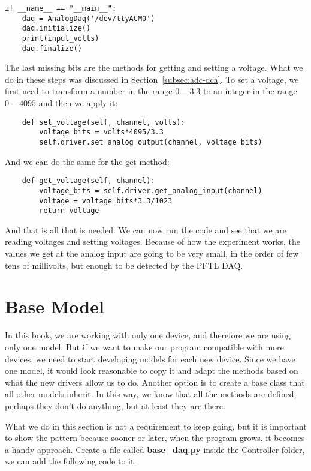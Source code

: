\begin{verbatim}
if __name__ == "__main__":
    daq = AnalogDaq('/dev/ttyACM0')
    daq.initialize()
    print(input_volts)
    daq.finalize()
\end{verbatim}

The last missing bits are the methods for getting and setting a voltage. What we do in these steps was discussed in Section~\ref{subsec:adc-dca}. To set a voltage, we first need to transform a number in the range $0-3.3$ to an integer in the range $0-4095$ and then we apply it:

\begin{verbatim}
    def set_voltage(self, channel, volts):
        voltage_bits = volts*4095/3.3
        self.driver.set_analog_output(channel, voltage_bits)
\end{verbatim}

And we can do the same for the get method:

\begin{verbatim}
    def get_voltage(self, channel):
        voltage_bits = self.driver.get_analog_input(channel)
        voltage = voltage_bits*3.3/1023
        return voltage
\end{verbatim}

And that is all that is needed. We can now run the code and see that we are reading voltages and setting voltages. Because of how the experiment works, the values we get at the analog input are going to be very small, in the order of few tens of millivolts, but enough to be detected by the {PFTL DAQ}.

\section{Base Model}\label{sec:base-model}
In this book, we are working with only one device, and therefore we are using only one model. But if we want to make our program compatible with more devices, we need to start developing models for each new device. Since we have one model, it would look reasonable to copy it and adapt the methods based on what the new drivers allow us to do. Another option is to create a base class that all other models inherit. In this way, we know that all the methods are defined, perhaps they don't do anything, but at least they are there.

What we do in this section is not a requirement to keep going, but it is important to show the pattern because sooner or later, when the program grows, it becomes a handy approach. Create a file called \textbf{base\_daq.py} inside the Controller folder, we can add the following code to it:

